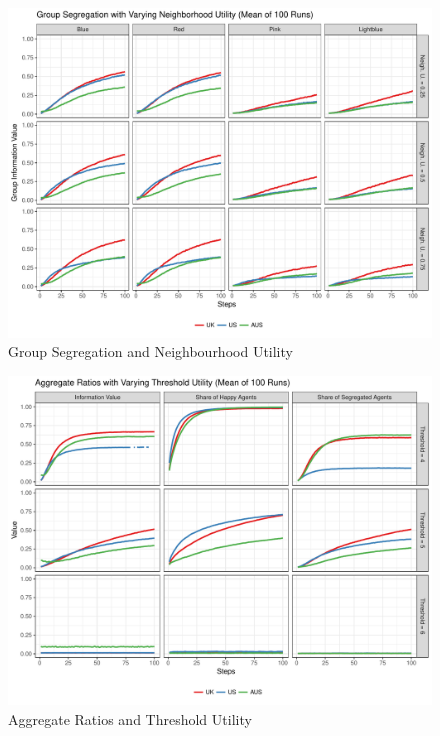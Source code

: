 \documentclass[12pt, a4paper]{article}
\begin{document}
	\begin{figure}[bp!]
		\centering
		\caption{Group Segregation and Neighbourhood Utility}
		\includegraphics[scale=0.6]{./Plots/nb_grp_ratios.pdf}
	\end{figure}
	
	\begin{figure}[bp!]
		\centering
		\caption{Aggregate Ratios and Threshold Utility}
		\includegraphics[scale=0.6]{./Plots/th_agg_ratios.pdf}
	\end{figure}
	
\end{document}
